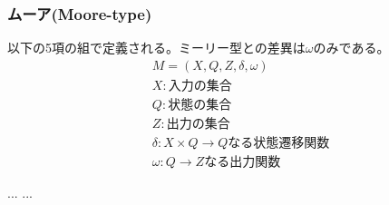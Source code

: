 \documentclass[a4j,10pt,oneside,openany,fleqn]{jsbook}
\begin{document}
\subsubsection{ムーア(Moore-type)}
以下の5項の組で定義される。ミーリー型との差異は$\omega$のみである。
\begin{align*}
  &M = (X, Q, Z, \delta, \omega)\\
  &X:\textrm{入力の集合}\\
  &Q:\textrm{状態の集合}\\
  &Z:\textrm{出力の集合}\\
  &\delta:X \times Q \rightarrow Q\textrm{なる状態遷移関数}\\
  &\omega:Q \rightarrow Z\textrm{なる出力関数}
\end{align*}

\begin{thebibliography}{20}
...
  ...
\end{thebibliography}

\newpage
\printindex
%
%
\end{document}
